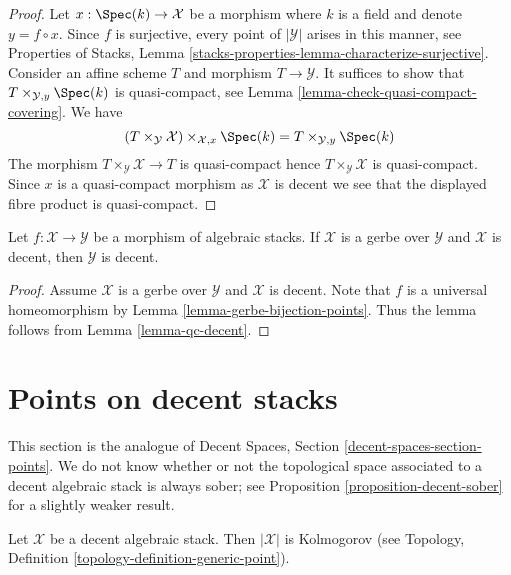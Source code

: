 \begin{proof}
Let $x : \Spec(k) \to \mathcal{X}$ be a morphism where $k$ is a field
and denote $y = f \circ x$. Since $f$ is surjective, every point
of $|\mathcal{Y}|$ arises in this manner, see Properties of Stacks,
Lemma \ref{stacks-properties-lemma-characterize-surjective}.
Consider an affine scheme $T$ and morphism
$T \to \mathcal{Y}$. It suffices to show that
$T \times_{\mathcal{Y}, y} \Spec(k)$ is quasi-compact, see
Lemma \ref{lemma-check-quasi-compact-covering}.
We have
$$
(T \times_{\mathcal{Y}} \mathcal{X}) \times_{\mathcal{X}, x} \Spec(k) =
T \times_{\mathcal{Y}, y} \Spec(k)
$$
The morphism $T \times_{\mathcal{Y}} \mathcal{X} \to T$ is quasi-compact
hence $T \times_\mathcal{Y} \mathcal{X}$ is quasi-compact. Since $x$ is
a quasi-compact morphism as $\mathcal{X}$ is decent
we see that the displayed fibre product is quasi-compact.
\end{proof}

\begin{lemma}
\label{lemma-gerbe-decent}
Let $f : \mathcal{X} \to \mathcal{Y}$ be a morphism of algebraic stacks.
If $\mathcal{X}$ is a gerbe over $\mathcal{Y}$ and $\mathcal{X}$ is decent,
then $\mathcal{Y}$ is decent.
\end{lemma}

\begin{proof}
Assume $\mathcal{X}$ is a gerbe over $\mathcal{Y}$ and $\mathcal{X}$ is decent.
Note that $f$ is a universal homeomorphism by
Lemma \ref{lemma-gerbe-bijection-points}.
Thus the lemma follows from Lemma \ref{lemma-qc-decent}.
\end{proof}



\section{Points on decent stacks}
\label{section-points-decent}

\noindent
This section is the analogue of Decent Spaces, Section
\ref{decent-spaces-section-points}.
We do not know whether or not the topological space associated
to a decent algebraic stack is always sober; see
Proposition \ref{proposition-decent-sober} for a slightly weaker result.

\begin{lemma}
\label{lemma-kolmogorov}
Let $\mathcal{X}$ be a decent algebraic stack.
Then $|\mathcal{X}|$ is Kolmogorov (see
Topology, Definition \ref{topology-definition-generic-point}).
\end{lemma}

